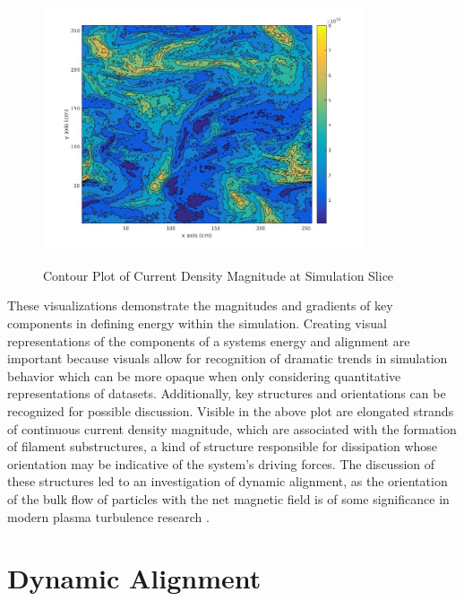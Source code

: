 \documentclass[journal, a4paper]{IEEEtran}
\begin{document}
\vspace{.4cm}
\begin{figure}[H]
\caption{Contour Plot of Current Density Magnitude at Simulation Slice}
\includegraphics[width=9.5cm]{current_density_magnitude_slice.jpg}
\label{figure2}
\centering
\end{figure}
\vspace{.4cm}

These visualizations demonstrate the magnitudes and gradients of key components in defining energy within the simulation. Creating visual representations of the components of a systems energy and alignment are important because visuals allow for recognition of dramatic trends in simulation behavior which can be more opaque when only considering quantitative representations of datasets. Additionally, key structures and orientations can be recognized for possible discussion. Visible in the above plot are elongated strands of continuous current density magnitude, which are associated with the formation of filament substructures, a kind of structure responsible for dissipation whose orientation may be indicative of the system’s driving forces. The discussion of these structures led to an investigation of dynamic alignment, as the orientation of the bulk flow of particles with the net magnetic field is of some significance in modern plasma turbulence research \cite{boldyrev}. 

\vspace{.4cm}
\section{Dynamic Alignment}
\vspace{.4cm}
\end{document}
